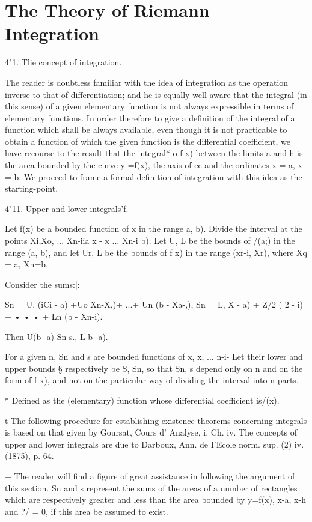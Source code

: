 \chapter{The Theory of Riemann Integration} 

4"1. Tlie concept of integration.

The reader is doubtless familiar with the idea of integration as the
operation inverse to that of differentiation; and he is equally well
aware that the integral (in this sense) of a given elementary function
is not always expressible in terms of elementary functions. In order
therefore to give a definition of the integral of a function which
shall be always available, even though it is not practicable to obtain
a function of which the given function is the differential
coefficient, we have recourse to the result that the integral* o f x)
between the limits a and h is the area bounded by the curve y =f(x),
the axis of cc and the ordinates x = a, x = b. We proceed to frame a
formal definition of integration with this idea as the starting-point.

4"11. Upper and lower integrals'f.

Let f(x) be a bounded function of x in the range a, b). Divide the
interval at the points Xi,Xo, ... Xn-iia x - x ... Xn-i b). Let U, L
be the bounds of /(a;) in the range (a, b), and let Ur, L be the
bounds of f x) in the range (xr-i, Xr), where Xq = a, Xn=b.

Consider the sums:|:

Sn = U, (iCi - a) +Uo Xn-X,)+ ...+ Un (b - Xa-,), Sn = L, X - a) + Z/2
( 2 - i) + • • • + Ln (b - Xn-i).

Then U(b- a) Sn s., L b- a).

For a given n, Sn and s are bounded functions of x, x, ... n-i- Let
their lower and upper bounds § respectively be S, Sn, so that Sn, s
depend only on n and on the form of f x), and not on the particular
way of dividing the interval into n parts.

* Defined as the (elementary) function whose differential coefficient
is/(x).

t The following procedure for establishing existence theorems
concerning integrals is based on that given by Goursat, Cours d'
Analyse, i. Ch. iv. The concepts of upper and lower integrals are due
to Darboux, Ann. de I'Ecole norm. sup. (2) iv. (1875), p. 64.

+ The reader will find a figure of great assistance in following the
argument of this section. Sn and s represent the sums of the areas of
a number of rectangles which are respectively greater and less than
the area bounded by y=f(x), x-a, x-h and ?/ = 0, if this area be
assumed to exist.


